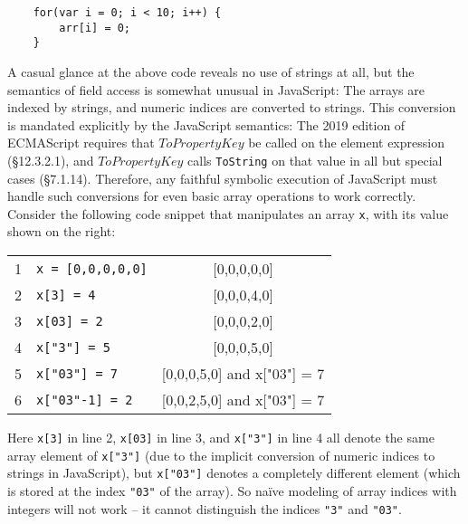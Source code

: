 \documentclass[sigplan,screen]{acmart}
\begin{document}
\begin{center}
	\begin{minipage}{\linewidth}
		\begin{verbatim}
    for(var i = 0; i < 10; i++) {
        arr[i] = 0;
    }
		\end{verbatim}
	\end{minipage}
\end{center}



A casual glance at the above code reveals no use of strings at all, but the semantics of field access is somewhat unusual in JavaScript: The arrays are indexed by strings, and numeric indices are converted to strings. This conversion is mandated explicitly by the JavaScript semantics: The 2019 edition of ECMAScript \cite{ecmascript2019ecmascript} requires that $ToPropertyKey$ be called on the element expression (\S{12.3.2.1}), and $ToPropertyKey$ calls {\tt{ToString}} on that value in all but special cases (\S{7.1.14}). Therefore, any faithful symbolic execution of JavaScript must handle such conversions for even basic array operations to work correctly. Consider the following code snippet that manipulates an array \texttt{x}, with its value shown on the right:


\begin{center}
\begin{tabular}{l|l|c}
1&{\tt{x = [0,0,0,0,0]}} & [0,0,0,0,0]\\
2&{\tt{x[3] = 4}} & [0,0,0,4,0] \\
3&{\tt{x[03] = 2}} & [0,0,0,2,0] \\
4&{\tt{x["3"] = 5}} & [0,0,0,5,0] \\
5&{\tt{x["03"] = 7}} & [0,0,0,5,0] and x["03"] = 7\\
6&{\tt{x["03"-1] = 2}} & [0,0,2,5,0] and x["03"] = 7\\
\end{tabular}
\end{center}

Here \texttt{x[3]} in line 2, \texttt{x[03]} in line 3, and \texttt{x["3"]} in line 4 all denote the same array element of \texttt{x["3"]} (due to the implicit conversion of numeric indices to strings in JavaScript), but \texttt{x["03"]} denotes a completely different element (which is stored at the index \texttt{"03"} of the array). So na\"ive modeling of array indices with integers will not work -- it cannot distinguish the indices \texttt{"3"} and \texttt{"03"}. 
\end{document}
